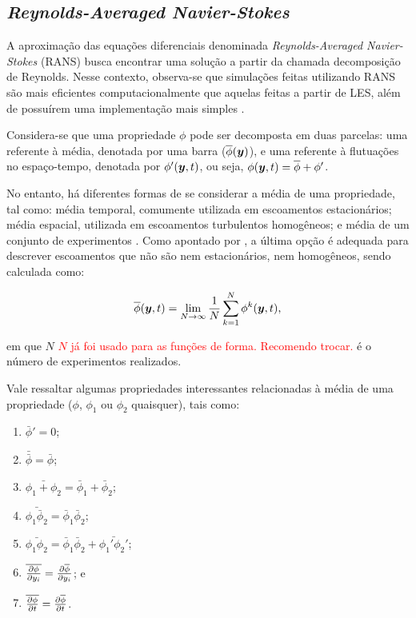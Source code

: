 \subsection{\textit{Reynolds-Averaged Navier-Stokes}} \label{RANS}

A aproximação das equações diferenciais denominada \textit{Reynolds-Averaged Navier-Stokes} (RANS) busca encontrar uma solução a partir da chamada decomposição de Reynolds. Nesse contexto, observa-se que simulações feitas utilizando RANS são mais eficientes computacionalmente que aquelas feitas a partir de LES, além de possuírem uma implementação mais simples \cite{alfonsi2009reynolds, ling2015evaluation}.

Considera-se que uma propriedade $\phi$ pode ser decomposta em duas parcelas: uma referente à média, denotada por uma barra ($\overline{\phi}(\boldsymbol{y})$), e uma referente à flutuações no espaço-tempo, denotada por $\phi'(\boldsymbol{y},t)$, ou seja, $\phi(\boldsymbol{y},t)=\overline{\phi}+\phi'$.

No entanto, há diferentes formas de se considerar a média de uma propriedade, tal como: média temporal, comumente utilizada em escoamentos estacionários; média espacial, utilizada em escoamentos turbulentos homogêneos; e média de um conjunto de experimentos \cite{tennekes1972first,speziale1991analytical,alfonsi2009reynolds}. Como apontado por , a última opção é adequada para descrever escoamentos que não são nem estacionários, nem homogêneos, sendo calculada como:

\begin{equation}
    \overline{\phi}(\boldsymbol{y},t)=\lim_{N\to\infty}{\frac{1}{N}\sum_{k=1}^N{\phi^{k}(\boldsymbol{y},t)}}\text{,}
\end{equation}

\noindent em que $N$ \textcolor{red}{$N$ já foi usado para as funções de forma. Recomendo trocar.} é o número de experimentos realizados.

Vale ressaltar algumas propriedades interessantes relacionadas à média de uma propriedade ($\phi$, $\phi_1$ ou $\phi_2$ quaisquer), tais como:

\begin{enumerate}[label=\alph*.]
    \item $\bar{\phi}'=0$;
    \item $\bar{\bar{\phi}}=\bar{\phi}$;
    \item $\bar{\phi_1+\phi_2}=\bar{\phi}_1+\bar{\phi}_2$;
    \item $\bar{\phi_1\bar{\phi}_2}=\bar{\phi}_1\bar{\phi}_2$;
    \item $\bar{\phi_1\phi_2}=\bar{\phi}_1\bar{\phi}_2+\bar{\phi_1'\phi_2'}$;
    \item $\overline{\frac{\partial{\phi}}{\partial{y_i}}}=\frac{\partial{\overline{\phi}}}{\partial{y_i}}$; e
    \item $\overline{\frac{\partial{\phi}}{\partial{t}}}=\frac{\partial{\overline{\phi}}}{\partial{t}}$.
\end{enumerate}

